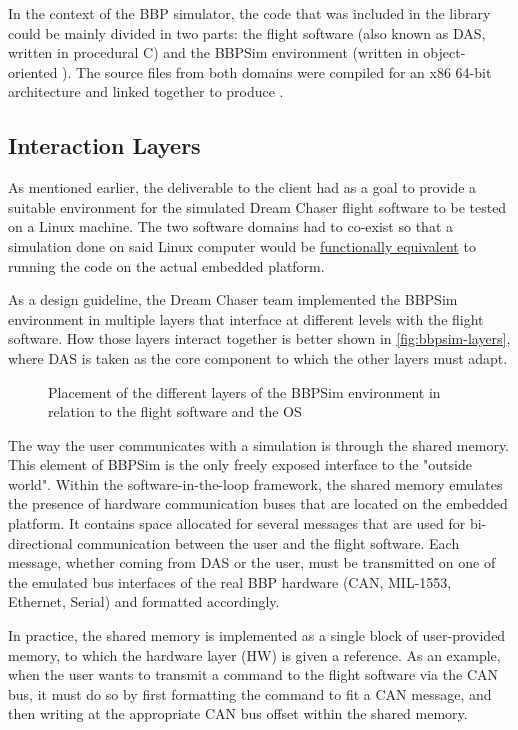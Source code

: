 {In the context of the \gls{BBP} simulator, the code that was included in the library could be mainly divided in two parts: the flight software (also known as \gls{DAS}, written in procedural C) and the \gls{BBPSim} environment (written in object-oriented \Cpp). The source files from both domains were compiled for an x86 64-bit architecture and linked together to produce .

\subsection*{Interaction Layers}
As mentioned earlier, the deliverable to the client had as a goal to provide a suitable environment for the simulated Dream Chaser flight software to be tested on a Linux machine. The two software domains had to co-exist so that a simulation done on said Linux computer would be \underline{functionally equivalent} to running the code on the actual embedded platform. 

As a design guideline, the Dream Chaser team implemented the \gls{BBPSim} environment in multiple layers that interface at different levels with the flight software. How those layers interact together is better shown in \autoref{fig:bbpsim-layers}, where \gls{DAS} is taken as the core component to which the other layers must adapt.

\begin{figure}[htbp]
	\vspace{12pt}
	\centering
	
	\caption{Placement of the different layers of the BBPSim environment in relation to the flight software and the OS}
	\label{fig:bbpsim-layers}
\end{figure}

The way the user communicates with a simulation is through the shared memory. This element of \gls{BBPSim} is the only freely exposed interface to the "outside world". Within the software-in-the-loop framework, the shared memory emulates the presence of hardware communication buses that are located on the embedded platform. It contains space allocated for several messages that are used for bi-directional communication between the user and the flight software. Each message, whether coming from DAS or the user, must be transmitted on one of the emulated bus interfaces of the real \gls{BBP} hardware (CAN, MIL-1553, Ethernet, Serial) and formatted accordingly.

In practice, the shared memory is implemented as a single block of user-provided memory, to which the hardware layer (HW) is given a reference. As an example, when the user wants to transmit a command to the flight software via the CAN bus, it must do so by first formatting the command to fit a CAN message, and then writing at the appropriate CAN bus offset within the shared memory. 

}
